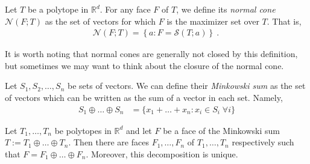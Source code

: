 \documentclass[anon]{colt2020} %
\newcommand{\reals}{\mathbb{R}}
\newcommand{\N}{\mathcal{N}}
\begin{document}
\begin{definition}
	Let $T$ be a polytope in $\reals^d$.
	For any face $F$ of $T$, we define its \emph{normal cone} $\N(F;T)$ as the set of vectors for which $F$ is the maximizer set over $T$.
	That is,
	\begin{align*}
	\N(F;T) = \left\{a : F = \mathcal{S}(T; a) \right\}~.~
	\end{align*}
\end{definition}

It is worth noting that normal cones are generally not closed by this definition, but sometimes we may want to think about the closure of the normal cone.
\fi

\begin{definition}
	Let $S_1, S_2, \ldots, S_n$ be sets of vectors.
	We can define their \emph{Minkowski sum} as the set of vectors which can be written as the sum of a vector in each set.
	Namely,
	\begin{align*}
	S_1 \oplus \ldots \oplus S_n &= \{x_1 + \ldots + x_n : x_i \in S_i \; \forall i \}
	\end{align*}
\end{definition}

\begin{theorem} \label{thm:unique-face-decomp}
	Let $T_1, \ldots, T_n$ be polytopes in $\reals^d$ and let $F$ be a face of the Minkowski sum $T := T_1 \oplus \ldots \oplus T_n$.
	Then there are faces $F_1, \ldots, F_n$ of $T_1, \ldots, T_n$ respectively such that $F = F_1 \oplus \ldots \oplus F_n$.
	Moreover, this decomposition is unique.
\end{theorem}

\end{document}
